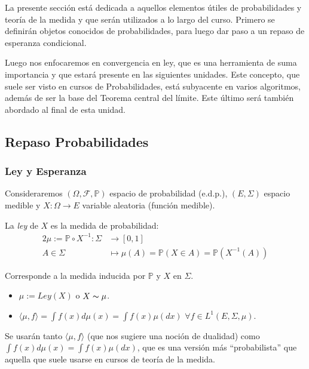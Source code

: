 La presente sección está dedicada a aquellos elementos útiles de probabilidades y teoría de la medida y que serán utilizados a lo largo del curso. Primero se definirán objetos conocidos de probabilidades, para luego dar paso a un repaso de esperanza condicional.

\newp Luego nos enfocaremos en convergencia en ley, que es una herramienta de suma importancia y que estará presente en las siguientes unidades. Este concepto, que suele ser visto en cursos de Probabilidades, está subyacente en varios algoritmos, además de ser la base del Teorema central del límite. Este último será también abordado al final de esta unidad.

\subsection{Repaso Probabilidades}
\subsubsection{Ley y Esperanza}

Consideraremos $(\Omega,\mathcal{F},\mathbb{P})$ espacio de probabilidad (e.d.p.), $(E,\Sigma)$ espacio medible y $X: \Omega \longrightarrow E$ variable aleatoria (función medible).

\begin{definition}[Ley de $X$]
La \textit{ley} de $X$ es la medida de probabilidad:
\begin{alignat*}{2}
    \mu := \mathbb{P} \circ X^{-1}:  \Sigma &\longrightarrow [0,1] \\
    A \in \Sigma & \longmapsto \mu(A)=\mathbb{P}(X \in A)=\mathbb{P}(X^{-1}(A))
\end{alignat*}

Corresponde a la medida inducida por $\mathbb{P}$ y $X$ en $\Sigma$.
\end{definition}

\begin{notation}
\beforeitemize
\begin{itemize}
    \item $\mu:=Ley(X)$ o $X\thicksim \mu$.
    \item $\displaystyle \langle \mu, f \rangle = \int f(x) d\mu(x) = \int f(x)\mu(dx)$ \espacio $\forall f \in L^1(E,\Sigma,\mu)$.
\end{itemize}
Se usarán tanto $\langle \mu, f \rangle$ (que nos sugiere una noción de dualidad) como $\int f(x) d\mu(x) = \int f(x)\mu(dx)$, que es una versión más ``probabilista'' que aquella que suele usarse en cursos de teoría de la medida.
\end{notation}

